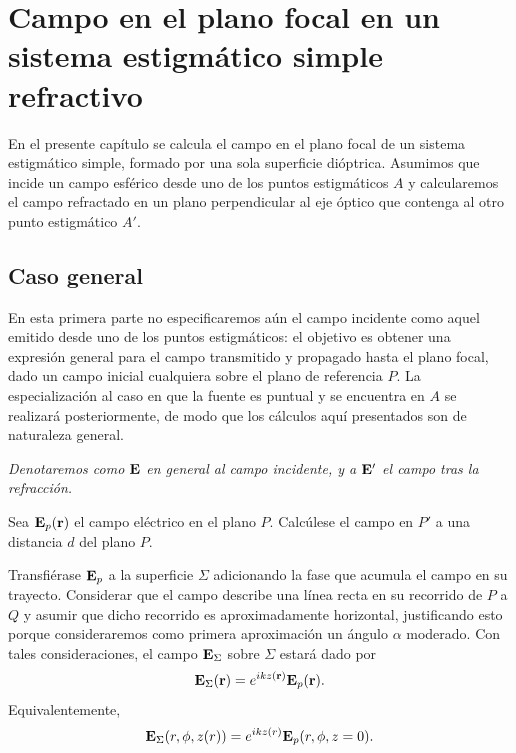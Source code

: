 \chapter{Campo en el plano focal en un sistema estigmático simple refractivo}
\label{ch:focal}

En el presente capítulo se calcula el campo en el plano focal de un sistema estigmático simple, formado por una sola superficie dióptrica. Asumimos que incide un campo esférico desde uno de los puntos estigmáticos $A$ y calcularemos el campo refractado en un plano perpendicular al eje óptico que contenga al otro punto estigmático $A'$.

\section{Caso general}
\label{sec:caso_general}

En esta primera parte no especificaremos aún el campo incidente como aquel emitido desde uno de los puntos estigmáticos: el objetivo es obtener una expresión general para el campo transmitido y propagado hasta el plano focal, dado un campo inicial cualquiera sobre el plano de referencia $P$. La especialización al caso en que la fuente es puntual y se encuentra en $A$ se realizará posteriormente, de modo que los cálculos aquí presentados son de naturaleza general.

\textit{Denotaremos como $\vb E$ en general al campo incidente, y a $\vb E'$ el campo tras la refracción.}

Sea $\vb{E}_p(\vb{r})$ el campo eléctrico en el plano $P$. Calcúlese el campo en $P'$ a una distancia $d$ del plano $P$.

Transfiérase $\vb{E}_p$ a la superficie $\Sigma$ adicionando la fase que acumula el campo en su trayecto. Considerar que el campo describe una línea recta en su recorrido de $P$ a $Q$ y asumir que dicho recorrido es aproximadamente horizontal, justificando esto porque consideraremos como primera aproximación un ángulo $\alpha$ moderado. Con tales consideraciones, el campo $\vb{E}_{\Sigma}$ sobre $\Sigma$ estará dado por
\begin{equation}
    \vb{E}_{\Sigma}(\vb{r})
    =
    e^{ikz(\vb{r})} \vb{E}_p(\vb{r}).
    \label{eq:Ep_from_E_Sigma}
\end{equation}
Equivalentemente,
\begin{equation}
    \vb{E}_{\Sigma}(r,\phi,z(r))
    =
    e^{ikz(r)} \vb{E}_p(r,\phi,z=0).
\end{equation}

